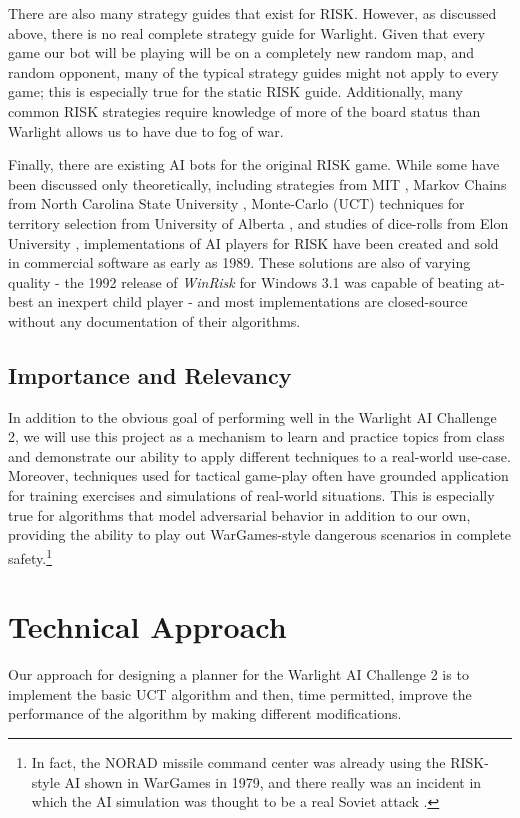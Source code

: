 \documentclass[a4paper,11pt]{article}
\begin{document}
There are also many strategy guides that exist for RISK.  However, as discussed 
above, there is no real complete strategy guide for Warlight.  Given that every 
game our bot will be playing will be on a completely new random map, and random opponent, 
many of the typical strategy guides might not apply to every game; this is especially 
true for the static RISK guide.  Additionally, many common RISK strategies require knowledge 
of more of the board status than Warlight allows us to have due to fog of war.

Finally, there are existing AI bots for the original RISK game.  While some have been 
discussed only theoretically, including strategies from MIT \cite{riskmit}, Markov 
Chains from North Carolina State University \cite{riskncs}, Monte-Carlo (UCT) 
techniques for territory selection from University of Alberta \cite{riskalb}, and 
studies of dice-rolls from Elon University \cite{riskelon}, implementations of AI 
players for RISK have been created and sold in commercial software as early as 1989. 
These solutions are also of varying quality - the 1992 release of \textit{WinRisk} for 
Windows 3.1 was capable of beating at-best an inexpert child player - and most 
implementations are closed-source without any documentation of their algorithms.

\subsection{Importance and Relevancy}\label{sec:importance}
In addition to the obvious goal of performing well in the Warlight AI Challenge 2, 
we will use this project as a mechanism to learn and practice topics from class and 
demonstrate our ability to apply different techniques to a real-world use-case.
Moreover, techniques used for tactical game-play often have grounded 
application for training exercises and simulations of real-world situations.  This is 
especially true for algorithms that model adversarial behavior in addition to our 
own, providing the ability to play out WarGames-style dangerous scenarios in 
complete safety.\footnote{In fact, the NORAD missile command center was already 
using the RISK-style AI shown in WarGames in 1979, and there really was an incident
in which the AI simulation was thought to be a real Soviet attack
\cite{wargamesreal}.}

%
\section{Technical Approach}\label{sec:approach}
Our approach for designing a planner for the Warlight AI Challenge 2 is to implement the basic UCT algorithm and then, time permitted, improve the performance of the algorithm by making different modifications.
\end{document}
